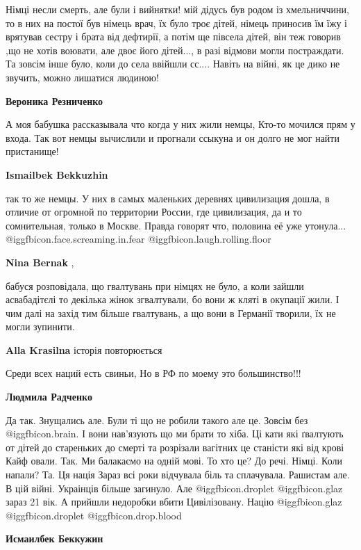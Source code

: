 \begin{itemize}
\begin{itemize}

Німці несли смерть, але були і вийнятки! мій дідусь був родом із хмельниччини,
то в них на постої був німець врач, їх було троє дітей, німець приносив їм їжу і
врятував сестру і брата від дефтирії, а потім ще півсела дітей, він теж говорив
,що не хотів воювати, але двоє його дітей..., в разі відмови могли постраждати.
Та зовсім інше було, коли до села ввійшли сс.... Навіть на війні, як це дико не
звучить, можно лишатися людиною!

\textbf{Вероника Резниченко} 

А моя бабушка рассказывала что когда у них жили немцы, Кто-то мочился прям у
входа. Так вот немцы вычислили и прогнали ссыкуна и он долго не мог найти
пристанище!

\textbf{Ismailbek Bekkuzhin} 

так то же немцы. У них в самых маленьких деревнях цивилизация дошла, в отличие
от огромной по территории России, где цивилизация, да и то сомнительная, только
в Москве. Правда говорят что, половина её уже утонула...  @igg{fbicon.face.screaming.in.fear}  @igg{fbicon.laugh.rolling.floor} 

\textbf{Nina Bernak} , 

бабуся розповідала, що гвалтувань при німцях не було, а коли зайшли
асвабадітєлі то декілька жінок згвалтували, бо вони ж кляті в окупації жили. І
чим далі на захід тим більше гвалтувань, а що вони в Германії творили, їх не
могли зупинити.

\textbf{Alla Krasilna} історія повторюється

Среди всех наций есть свиньи, Но в РФ по моему это большинство!!!

\textbf{Людмила Радченко} 

Да так. Знущались але. Були ті що не робили такого але це. Зовсім без
@igg{fbicon.brain}. І вони нав'язують що ми брати то хіба. Ці кати які
ґвалтують от дітей до стареньких до смерті та розрізали вагітних це станісти
які від крові Кайф овали. Так. Ми балакаємо на одній мові. То хто це? До речі.
Німці. Коли напали?  Та. Ця нація Зараз всі роки відчувала біль та сплачувала.
Рашистам але. В цій війні. Украінців більше загинуло. Але  @igg{fbicon.droplet}
@igg{fbicon.glaz} зараз 21 вік. А прийшли недоробки вбити Цивілізовану. Націю
@igg{fbicon.glaz}  @igg{fbicon.droplet}  @igg{fbicon.drop.blood} 

\textbf{Исмаилбек Беккужин} 


\end{itemize}
\end{itemize}

